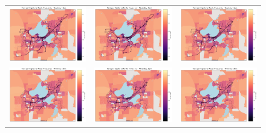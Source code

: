 \documentclass[letter]{article}
\begin{document}
\begin{figure}
\begin{center}
\begin{tabular}{ c c c }
     \includegraphics[width=60mm]{CarOwnershipVSfrequency4pm.png}   & \includegraphics[width=60mm]{CarOwnershipVSfrequency5pm.png}  & \includegraphics[width=60mm]{CarOwnershipVSfrequency6pm.png}  \\
    
      \includegraphics[width=60mm]{CarOwnershipVSfrequency7pm.png}   & \includegraphics[width=60mm]{CarOwnershipVSfrequency8pm.png}  & \includegraphics[width=60mm]{CarOwnershipVSfrequency9pm.png}  \\
      

\end{tabular}
\end{center}
\end{figure}
\end{document}
